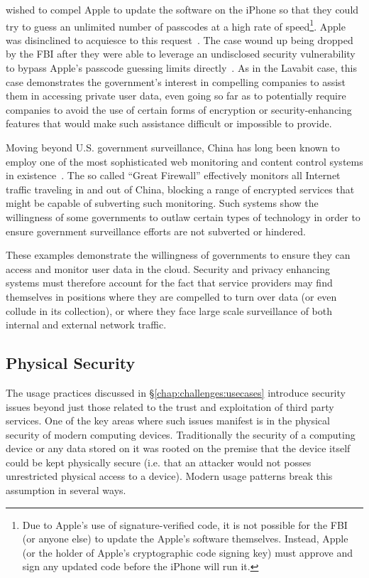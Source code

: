 \begin{packed_desc}
  wished to compel Apple to update the software on the iPhone so that
  they could try to guess an unlimited number of passcodes at a high
  rate of speed\footnote{Due to Apple's use of signature-verified
    code, it is not possible for the FBI (or anyone else) to update
    the Apple's software themselves. Instead, Apple (or the holder of
    Apple's cryptographic code signing key) must approve and sign any
    updated code before the iPhone will run
    it.}\cite{eff-applecrypto}. Apple was disinclined to acquiesce to
  this request~\cite{apple-fbiletter}. The case wound up being dropped
  by the FBI after they were able to leverage an undisclosed security
  vulnerability to bypass Apple's passcode guessing limits
  directly~\cite{ars-fbi-greyhats, ars-fbi-breakthrough}. As in the
  Lavabit case, this case demonstrates the government's interest in
  compelling companies to assist them in accessing private user data,
  even going so far as to potentially require companies to avoid the
  use of certain forms of encryption or security-enhancing features
  that would make such assistance difficult or impossible to provide.
\item[The Great Firewall:] Moving beyond U.S. government surveillance,
  China has long been known to employ one of the most sophisticated
  web monitoring and content control systems in
  existence~\cite{rsf-china}. The so called ``Great Firewall''
  effectively monitors all Internet traffic traveling in and out of
  China, blocking a range of encrypted services that might be capable
  of subverting such monitoring. Such systems show the willingness of
  some governments to outlaw certain types of technology in order to
  ensure government surveillance efforts are not subverted or
  hindered.
\end{packed_desc}

These examples demonstrate the willingness of governments to ensure
they can access and monitor user data in the cloud. Security and
privacy enhancing systems must therefore account for the fact that
service providers may find themselves in positions where they are
compelled to turn over data (or even collude in its collection), or
where they face large scale surveillance of both internal and external
network traffic.

\subsection{Physical Security}

The usage practices discussed in \S\ref{chap:challenges:usecases}
introduce security issues beyond just those related to the trust and
exploitation of third party services. One of the key areas where such
issues manifest is in the physical security of modern computing
devices. Traditionally the security of a computing device or any data
stored on it was rooted on the premise that the device itself could be
kept physically secure (i.e. that an attacker would not posses
unrestricted physical access to a device). Modern usage patterns break
this assumption in several ways.

